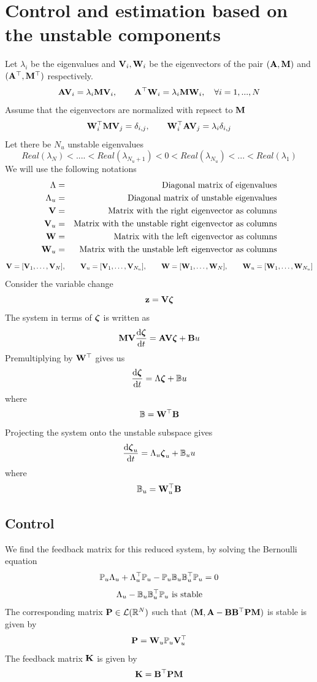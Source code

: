 \documentclass[12pt]{article}
\begin{document}
\section{Control and estimation based on the unstable components}
Let $\lambda_i$ be the eigenvalues and ${\mathbf V}_i, {\mathbf W}_i$ be the eigenvectors of the pair $({\mathbf A},{\mathbf M})$ and $({\mathbf A}^\top,{\mathbf M}^\top)$ respectively.
\[
 {\mathbf A} {\mathbf V}_i = \lambda_i {\mathbf M} {\mathbf V}_i, \qquad {\mathbf A}^\top {\mathbf W}_i = \lambda_i {\mathbf M} {\mathbf W}_i, \quad \forall i = 1,...,N
\]
Assume that the eigenvectors are normalized with repsect to ${\mathbf M}$
\begin{equation}
 {\mathbf W}_i^\top {\mathbf M} {\mathbf V}_j = \delta_{i,j}, \qquad
 {\mathbf W}_i^\top {\mathbf A} {\mathbf V}_j = \lambda_i \delta_{i,j}
\label{eq:orthcond}
\end{equation}
Let there be $N_u$ unstable eigenvalues
\[
 Real(\lambda_{N}) < .... < Real(\lambda_{N_u +1}) < 0 < Real(\lambda_{N_u}) < ... < Real(\lambda_1)
\]
We will use the following notations 
\begin{eqnarray*}
\Lambda &=& \mbox{Diagonal matrix of eigenvalues} \\
\Lambda_u &=& \mbox{Diagonal matrix of unstable eigenvalues} \\
{\mathbf V} &=& \mbox{Matrix with the right eigenvector as columns} \\
{\mathbf V}_u &=& \mbox{Matrix with the unstable right eigenvector as columns} \\
{\mathbf W} &=& \mbox{Matrix with the left eigenvector as columns} \\
{\mathbf W}_u &=& \mbox{Matrix with the unstable left eigenvector as columns} \\
\end{eqnarray*}
\[
{\mathbf V} = [{\mathbf V}_1, \ldots, {\mathbf V}_N], \qquad {\mathbf V}_u = [{\mathbf V}_1, \ldots, {\mathbf V}_{N_u}], \qquad {\mathbf W} = [{\mathbf W}_1, \ldots, {\mathbf W}_N], \qquad {\mathbf W}_u = [{\mathbf W}_1, \ldots, {\mathbf W}_{N_u}]
\]
Consider the variable change
\[
 {\mathbf z} = {\mathbf V} \boldsymbol{\zeta}
\]
The system in terms of $\boldsymbol{\zeta}$ is written as
\[
 {\mathbf M} {\mathbf V} \frac{\textrm{d} \boldsymbol{\zeta}}{\textrm{d} t} = {\mathbf A} {\mathbf V} \boldsymbol{\zeta} + {\mathbf B} u
\]
Premultiplying by ${\mathbf W}^\top$ gives us
\[
 \frac{\textrm{d} \boldsymbol{\zeta}}{\textrm{d} t} = \Lambda \boldsymbol{\zeta} + \mathbb{B} u
\]
where
\[
 \mathbb{B} = {\mathbf W}^\top {\mathbf B}
\]
Projecting the system onto the unstable subspace gives
\[
 \frac{\textrm{d} \boldsymbol{\zeta}_u}{\textrm{d} t} = \Lambda_u \boldsymbol{\zeta}_u + \mathbb{B}_u u
\]
where
\[
\mathbb{B}_u = {\mathbf W}^\top_u {\mathbf B}
\]

\subsection{Control}
We find the feedback matrix for this reduced system, by solving the Bernoulli equation
\begin{equation}
 \mathbb{P}_u \Lambda_u + \Lambda^\top_u \mathbb{P}_u - \mathbb{P}_u \mathbb{B}_u \mathbb{B}_u^\top \mathbb{P}_u = 0
\label{eq:ricu}
\end{equation}
\[
 \Lambda_u - \mathbb{B}_u \mathbb{B}_u^\top \mathbb{P}_u \text{ is stable}
\]
The corresponding matrix ${\mathbf P} \in \mathcal{L}(\mathbb{R}^{N})$ such that $({\mathbf M},{\mathbf A} - {\mathbf B}{\mathbf B}^\top{\mathbf P}{\mathbf M})$ is stable is given by
\[
 {\mathbf P} = {\mathbf W}_u \mathbb{P}_u {\mathbf V}_u^\top
\]
The feedback matrix ${\mathbf K}$ is given by
\[
 {\mathbf K} = {\mathbf B}^\top{\mathbf P}{\mathbf M}
\]
\end{document}
